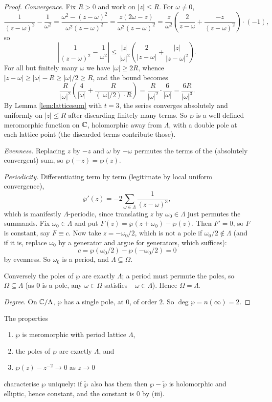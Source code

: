 \documentclass[a4paper]{scrartcl}
\begin{document}
\begin{proof}
	\emph{Convergence.} Fix $R > 0$ and work on $|z| \leq R$. For $\omega \neq 0$,
	$$
	\frac{1}{(z-\omega)^2}-\frac{1}{\omega^2} = \frac{\omega^2 - (z-\omega)^2}{\omega^2(z-\omega)^2}
	= \frac{z(2\omega - z)}{\omega^2(z-\omega)^2}
	= \frac{z}{\omega^2}\left(\frac{2}{z - \omega} + \frac{-z}{(z-\omega)^2}\right)\cdot(-1),
	$$
	so
	$$
	\left|\frac{1}{(z-\omega)^2}-\frac{1}{\omega^2}\right|
	\leq \frac{|z|}{|\omega|^2}\left(\frac{2}{|z-\omega|}+\frac{|z|}{|z-\omega|^2}\right).
	$$
	For all but finitely many $\omega$ we have $|\omega|\geq 2R$, whence
	$|z - \omega| \geq |\omega| - R \geq |\omega|/2 \geq R$, and the bound becomes
	$$
	\frac{R}{|\omega|^2}\left(\frac{4}{|\omega|}+\frac{R}{(|\omega|/2)\cdot R}\right)
	= \frac{R}{|\omega|^2}\cdot\frac{6}{|\omega|} = \frac{6R}{|\omega|^3}.
	$$
	By Lemma \ref{lem:latticesum} with $t = 3$, the series converges absolutely and
	uniformly on $|z|\leq R$ after discarding finitely many terms. So $\wp$ is a
	well-defined meromorphic function on $\mathbb{C}$, holomorphic away from $\Lambda$, with a
	double pole at each lattice point (the discarded terms contribute those).

	\emph{Evenness.} Replacing $z$ by $-z$ and $\omega$ by $-\omega$ permutes the terms of
	the (absolutely convergent) sum, so $\wp(-z)=\wp(z)$.

	\emph{Periodicity.} Differentiating term by term (legitimate by local uniform
	convergence),
	$$
	\wp'(z) = -2\sum_{\omega\in\Lambda}\frac{1}{(z-\omega)^3},
	$$
	which is manifestly $\Lambda$-periodic, since translating $z$ by $\omega_0 \in\Lambda$
	just permutes the summands. Fix $\omega_0 \in \Lambda$ and put
	$F(z) = \wp(z+\omega_0)-\wp(z)$. Then $F' = 0$, so $F$ is constant, say $F \equiv c$.
	Now take $z = -\omega_0/2$, which is not a pole if $\omega_0/2 \notin\Lambda$ (and if it
	is, replace $\omega_0$ by a generator and argue for generators, which suffices):
	$$
	c = \wp(\omega_0/2)-\wp(-\omega_0/2) = 0
	$$
	by evenness. So $\omega_0$ is a period, and $\Lambda \subseteq \Omega$.

	Conversely the poles of $\wp$ are exactly $\Lambda$; a period must permute the poles, so
	$\Omega \subseteq \Lambda$ (as $0$ is a pole, any $\omega \in \Omega$ satisfies
	$-\omega \in \Lambda$). Hence $\Omega = \Lambda$.

	\emph{Degree.} On $\mathbb{C}/\Lambda$, $\wp$ has a single pole, at $0$, of order $2$. So
	$\deg\wp = n(\infty) = 2$.
\end{proof}

\begin{remark}
	The properties
	\begin{enumerate}[label=(\roman*)]
		\item $\wp$ is meromorphic with period lattice $\Lambda$,
		\item the poles of $\wp$ are exactly $\Lambda$, and
		\item $\wp(z) - z^{-2}\to 0$ as $z \to 0$
	\end{enumerate}
	characterise $\wp$ uniquely: if $\tilde\wp$ also has them then $\wp - \tilde\wp$ is
	holomorphic and elliptic, hence constant, and the constant is $0$ by (iii).
\end{remark}
\end{document}
